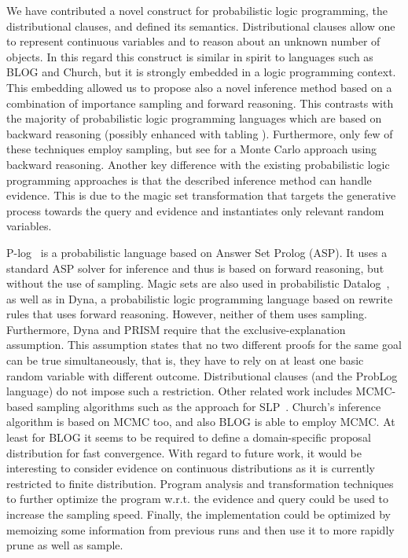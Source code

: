 \documentclass{tlp}
\begin{document}
We have contributed a novel construct for probabilistic logic
programming, the distributional clauses, and defined its semantics.
Distributional clauses allow one to represent continuous variables and
to reason about an unknown number of objects. In this regard this
construct is similar in spirit to languages such as BLOG and Church,
but it is strongly embedded in a logic programming context.  This
embedding allowed us to propose also a novel inference method based on
a combination of importance sampling and forward reasoning. This
contrasts with the majority of probabilistic logic programming
languages which are based on backward reasoning (possibly enhanced
with tabling \cite{SatoKameya:01,Mantadelis10iclp}).  Furthermore,
only few of these techniques employ sampling, but see \cite{Kimmig11}
for a Monte Carlo approach using backward reasoning.  Another key
difference with the existing probabilistic logic programming
approaches is that the described inference method can handle
evidence. This is due to the magic set transformation that targets the
generative process towards the query and evidence and instantiates
only relevant random variables.  

P-log~\cite{Baral09} is a probabilistic language based on Answer Set
Prolog (ASP). It uses a standard ASP solver for inference and thus is
based on forward reasoning, but without the use of sampling.  Magic
sets are also used in probabilistic Datalog~\cite{Fuhr00}, as well as
in Dyna, a probabilistic logic programming language \cite{Eisner05}
based on rewrite rules that uses forward reasoning. However, neither
of them uses sampling. Furthermore, Dyna and PRISM require that the
exclusive-explanation assumption.  This assumption states that no two
different proofs for the same goal can be true simultaneously, that
is, they have to rely on at least one basic random variable with
different outcome. Distributional clauses (and the ProbLog language)
do not impose such a restriction.  Other related work includes
MCMC-based sampling algorithms such as the approach for
SLP~\cite{cussensmc}.  Church's inference algorithm is based on MCMC
too, and also BLOG is able to employ MCMC.  At least for BLOG it seems
to be required to define a domain-specific proposal distribution for
fast convergence.  With regard to future work, it would be interesting
to consider evidence on continuous distributions as it is currently
restricted to finite distribution. Program analysis and transformation
techniques to further optimize the program w.r.t. the evidence and
query could be used to increase the sampling speed.  Finally, the
implementation could be optimized by memoizing some information from
previous runs and then use it to more rapidly prune as well as sample.
\end{document}
